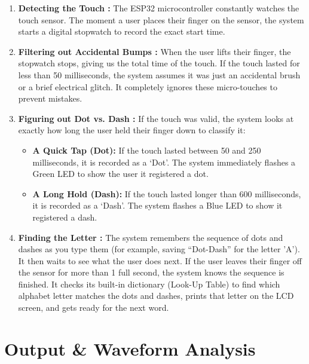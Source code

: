 \documentclass[12pt,a4paper]{article}
\begin{document}
	\begin{enumerate}
		\item \textbf{Detecting the Touch :} 
		The ESP32 microcontroller constantly watches the touch sensor. The moment a user places their finger on the sensor, the system starts a digital stopwatch to record the exact start time.
		
		\item \textbf{Filtering out Accidental Bumps :} 
		When the user lifts their finger, the stopwatch stops, giving us the total time of the touch. If the touch lasted for less than 50 milliseconds, the system assumes it was just an accidental brush or a brief electrical glitch. It completely ignores these micro-touches to prevent mistakes.
		
		\item \textbf{Figuring out Dot vs. Dash :} 
		If the touch was valid, the system looks at exactly how long the user held their finger down to classify it:
		\begin{itemize}
			\item \textbf{A Quick Tap (Dot):} If the touch lasted between 50 and 250 milliseconds, it is recorded as a `Dot'. The system immediately flashes a Green LED to show the user it registered a dot.
			\item \textbf{A Long Hold (Dash):} If the touch lasted longer than 600 milliseconds, it is recorded as a `Dash'. The system flashes a Blue LED to show it registered a dash.
		\end{itemize}
		
		\item \textbf{Finding the Letter :} 
		The system remembers the sequence of dots and dashes as you type them (for example, saving ``Dot-Dash'' for the letter 'A'). It then waits to see what the user does next. If the user leaves their finger off the sensor for more than 1 full second, the system knows the sequence is finished. It checks its built-in dictionary (Look-Up Table) to find which alphabet letter matches the dots and dashes, prints that letter on the LCD screen, and gets ready for the next word.
	\end{enumerate}
	
	\section{Output \& Waveform Analysis}
\end{document}

